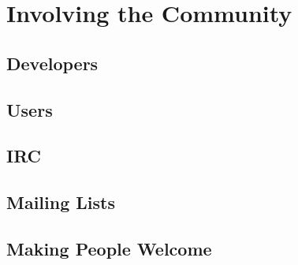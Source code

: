 \chapter{Involving the Community}

\section{Developers}

\section{Users}

\section{IRC}

\section{Mailing Lists}

\section{Making People Welcome}

